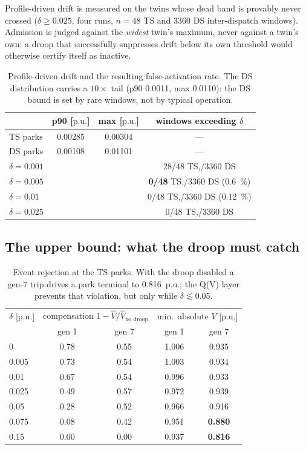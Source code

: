 \documentclass[11pt,a4paper]{article}
\newcommand{\pu}{\ensuremath{\mathrm{p.u.}}}
\newcommand{\dz}{\ensuremath{\delta}}
\begin{document}
Profile-driven drift is measured on the twins whose dead band is provably never
crossed ($\dz \geq 0.025$, four runs, $n=48$ TS and $3360$ DS inter-dispatch
windows). Admission is judged against the \emph{widest} twin's maximum, never
against a twin's own: a droop that successfully suppresses drift below its own
threshold would otherwise certify itself as inactive.

\begin{table}[htbp]
\centering
\begin{tabular}{lccc}
\toprule
 & p90 [\pu] & max [\pu] & windows exceeding $\dz$ \\
\midrule
TS parks & 0.00285 & 0.00304 & --- \\
DS parks & 0.00108 & 0.01101 & --- \\
\midrule
$\dz = 0.001$ & & & 28/48 TS,\; 499/3360 DS \\
$\dz = 0.005$ & & & \textbf{0/48} TS,\; 20/3360 DS (\SI{0.6}{\percent}) \\
$\dz = 0.01$  & & & 0/48 TS,\; 4/3360 DS (\SI{0.12}{\percent}) \\
$\dz = 0.025$ & & & 0/48 TS,\; 0/3360 DS \\
\bottomrule
\end{tabular}
\caption{Profile-driven drift and the resulting false-activation rate. The DS
distribution carries a $10\times$ tail (p90 0.0011, max 0.0110): the DS bound is
set by rare windows, not by typical operation.}
\label{tab:n1drift}
\end{table}

\subsection{The upper bound: what the droop must catch}

\begin{table}[htbp]
\centering
\begin{tabular}{lcccc}
\toprule
$\dz$ [\pu] & \multicolumn{2}{c}{compensation $1-\hat V/\hat V_{\text{no droop}}$}
            & \multicolumn{2}{c}{min.\ absolute $V$ [\pu]} \\
 & gen 1 & gen 7 & gen 1 & gen 7 \\
\midrule
0      & 0.78 & 0.55 & 1.006 & 0.935 \\
0.005  & 0.73 & 0.54 & 1.003 & 0.934 \\
0.01   & 0.67 & 0.54 & 0.996 & 0.933 \\
0.025  & 0.49 & 0.57 & 0.972 & 0.939 \\
0.05   & 0.28 & 0.52 & 0.966 & 0.916 \\
0.075  & 0.08 & 0.42 & 0.951 & \textbf{0.880} \\
0.15   & 0.00 & 0.00 & 0.937 & \textbf{0.816} \\
\bottomrule
\end{tabular}
\caption{Event rejection at the TS parks. With the droop disabled a gen-7 trip
drives a park terminal to \SI{0.816}{\pu}; the Q(V) layer prevents that
violation, but only while $\dz \lesssim 0.05$.}
\label{tab:n1reject}
\end{table}
\end{document}

